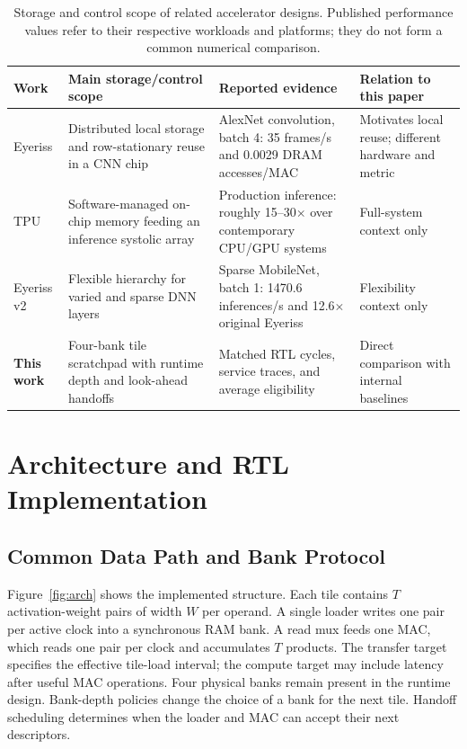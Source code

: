\documentclass[twocolumn,10pt]{article}
\begin{document}
\begin{table}[t]
\centering\caption{Storage and control scope of related accelerator designs.
Published performance values refer to their respective workloads and
platforms; they do not form a common numerical comparison.}
\label{tab:prior}\small
\setlength{\tabcolsep}{4pt}
\begin{tabular}{>{\raggedright\arraybackslash}p{}>{\raggedright\arraybackslash}p{}>{\raggedright\arraybackslash}p{}>{\raggedright\arraybackslash}p{}}
\toprule
Work & Main storage/control scope & Reported evidence & Relation to this paper\\
\midrule
Eyeriss \cite{chen2017eyeriss} & Distributed local storage and
row-stationary reuse in a CNN chip & AlexNet convolution, batch 4:
35 frames/s and 0.0029 DRAM accesses/MAC & Motivates local reuse;
different hardware and metric\\
TPU \cite{jouppi2017tpu} & Software-managed on-chip memory feeding an
inference systolic array & Production inference: roughly 15--30$\times$
over contemporary CPU/GPU systems & Full-system context only\\
Eyeriss v2 \cite{chen2019eyerissv2} & Flexible hierarchy for varied and
sparse DNN layers & Sparse MobileNet, batch 1: 1470.6 inferences/s and
12.6$\times$ original Eyeriss & Flexibility context only\\
\textbf{This work} & Four-bank tile scratchpad with runtime depth and
look-ahead handoffs & Matched RTL cycles, service traces,
and average eligibility & Direct comparison with internal baselines\\
\bottomrule
\end{tabular}
\end{table}

\section{Architecture and RTL Implementation}
\subsection{Common Data Path and Bank Protocol}
Figure~\ref{fig:arch} shows the implemented structure. Each tile contains
$T$ activation-weight pairs of width $W$ per operand. A single loader
writes one pair per active clock into a synchronous RAM bank. A read mux
feeds one MAC, which reads one pair per clock and accumulates $T$ products.
The transfer target specifies the effective tile-load interval; the compute
target may include latency after useful MAC operations. Four physical banks remain present in the
runtime design. Bank-depth policies change the choice of a bank for the next
tile. Handoff scheduling determines when the loader and MAC can accept
their next descriptors.
\end{document}
